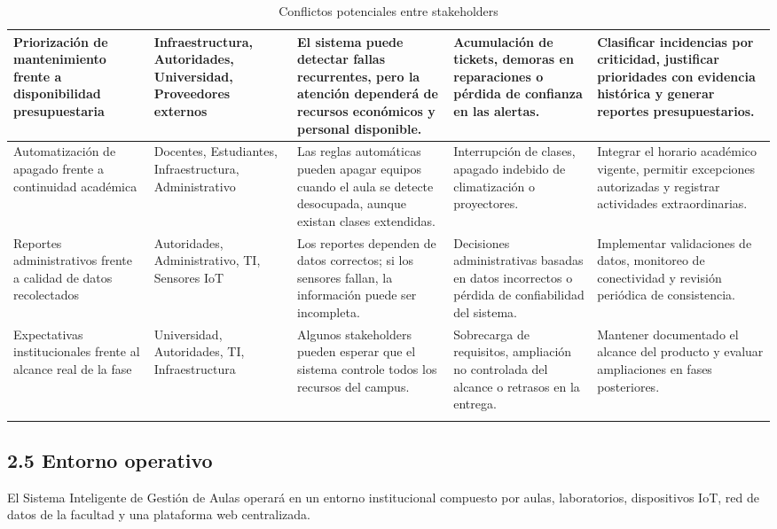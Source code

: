 \begin{longtable}{|P{0.2000}|P{0.2000}|P{0.2000}|P{0.2000}|P{0.2000}|}
Priorización de mantenimiento frente a disponibilidad presupuestaria & Infraestructura, Autoridades, Universidad, Proveedores externos & El sistema puede detectar fallas recurrentes, pero la atención dependerá de recursos económicos y personal disponible. & Acumulación de tickets, demoras en reparaciones o pérdida de confianza en las alertas. & Clasificar incidencias por criticidad, justificar prioridades con evidencia histórica y generar reportes presupuestarios. \\ \hline
Automatización de apagado frente a continuidad académica & Docentes, Estudiantes, Infraestructura, Administrativo & Las reglas automáticas pueden apagar equipos cuando el aula se detecte desocupada, aunque existan clases extendidas. & Interrupción de clases, apagado indebido de climatización o proyectores. & Integrar el horario académico vigente, permitir excepciones autorizadas y registrar actividades extraordinarias. \\ \hline
Reportes administrativos frente a calidad de datos recolectados & Autoridades, Administrativo, TI, Sensores IoT & Los reportes dependen de datos correctos; si los sensores fallan, la información puede ser incompleta. & Decisiones administrativas basadas en datos incorrectos o pérdida de confiabilidad del sistema. & Implementar validaciones de datos, monitoreo de conectividad y revisión periódica de consistencia. \\ \hline
Expectativas institucionales frente al alcance real de la fase & Universidad, Autoridades, TI, Infraestructura & Algunos stakeholders pueden esperar que el sistema controle todos los recursos del campus. & Sobrecarga de requisitos, ampliación no controlada del alcance o retrasos en la entrega. & Mantener documentado el alcance del producto y evaluar ampliaciones en fases posteriores. \\ \hline
\caption{Conflictos potenciales entre stakeholders}
\end{longtable}
\endgroup

\subsection*{2.5 Entorno operativo}


El Sistema Inteligente de Gestión de Aulas operará en un entorno institucional compuesto por aulas, laboratorios, dispositivos IoT, red de datos de la facultad y una plataforma web centralizada.


